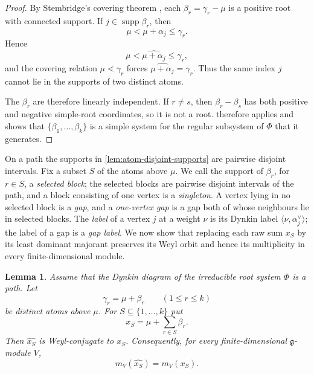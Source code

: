 \documentclass[11pt]{article}
\newtheorem{lemma}[lemma]{Lemma}
\theoremstyle{definition}
\theoremstyle{remark}
\newcommand{\Raiz}{\Phi}
\newcommand{\supp}{\operatorname{supp}}
\begin{document}
\begin{proof}
By Stembridge's covering theorem \cite[Theorem~2.8]{Stembridge}, each
$\beta_r=\gamma_r-\mu$ is a positive root with connected support.  If
$j\in\supp\beta_r$, then
\[
   \mu<\mu+\alpha_j\le\gamma_r.
\]
Hence
\[
   \mu<\widehat{\mu+\alpha_j}\le\gamma_r,
\]
and the covering relation $\mu\lessdot\gamma_r$ forces
$\widehat{\mu+\alpha_j}=\gamma_r$.  Thus the same index $j$ cannot lie in the
supports of two distinct atoms.

The $\beta_r$ are therefore linearly independent.  If $r\ne s$, then
$\beta_r-\beta_s$ has both positive and negative simple-root coordinates, so
it is not a root.   therefore applies and shows that
$\{\beta_1,\ldots,\beta_k\}$ is a simple system for the regular subsystem of
$\Raiz$ that it generates.
\end{proof}

On a path the supports in \cref{lem:atom-disjoint-supports} are pairwise
disjoint intervals.  Fix a subset $S$ of the atoms above $\mu$.  We call the
support of $\beta_r$, for $r\in S$, a \emph{selected block}; the selected
blocks are pairwise disjoint intervals of the path, and a block consisting of
one vertex is a \emph{singleton}.  A vertex lying in no selected block is a
\emph{gap}, and a \emph{one-vertex gap} is a gap both of whose neighbours lie
in selected blocks.  The \emph{label} of a vertex $j$ at a weight $\nu$ is its
Dynkin label $\langle\nu,\alpha_j^\vee\rangle$; the label of a gap is a
\emph{gap label}.  We now show that replacing each raw sum $x_S$ by its
least dominant majorant preserves its Weyl orbit and hence its multiplicity
in every finite-dimensional module.

\begin{lemma}\label{lem:path-crown-stabilization}
Assume that the Dynkin diagram of the irreducible root system $\Raiz$ is a
path.  Let
\[
   \gamma_r=\mu+\beta_r\qquad(1\le r\le k)
\]
be distinct atoms above $\mu$.  For $S\subseteq\{1,\ldots,k\}$ put
\[
   x_S=\mu+\sum_{r\in S}\beta_r.
\]
Then $\widehat{x_S}$ is Weyl-conjugate to $x_S$.  Consequently, for every
finite-dimensional $\mathfrak g$-module $V$,
\begin{equation}\label{eq:path-join-multiplicity}
   m_V(\widehat{x_S})=m_V(x_S).
\end{equation}
\end{lemma}
\end{document}
